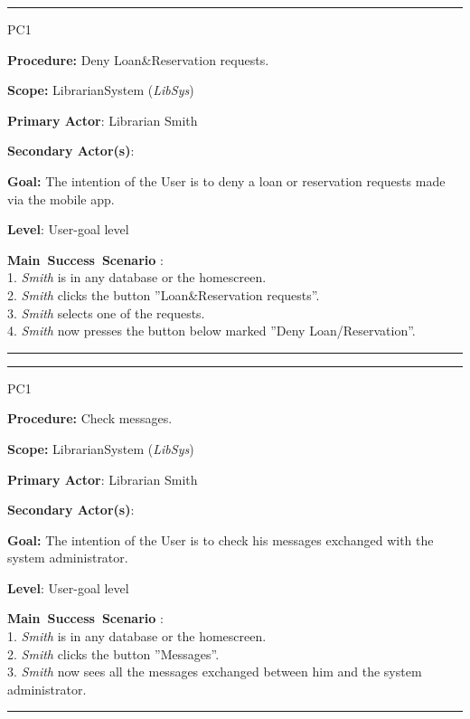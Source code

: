 
\vspace{0.5cm}
\hrule
\begin{lyxlist}{PC1}
\small{
\item [\textbf{Procedure:}] Deny Loan\&Reservation requests.
\item [\textbf{Scope:}] LibrarianSystem (\emph{LibSys})
\item [\textbf{Primary Actor}:] Librarian Smith
\item [\textbf{Secondary Actor(s)}:] 
\item [\textbf{Goal:}] The intention of the User is to deny a loan or
reservation requests made via the mobile app.
\item [\textbf{Level}:] User-goal level
\item [\textbf{Main~Success~Scenario}]:\\
1. \emph{Smith} is in any database or the homescreen.\\
2. \emph{Smith} clicks the button ''Loan\&Reservation requests''.\\
3. \emph{Smith} selects one of the requests.\\
4. \emph{Smith} now presses the button below marked ''Deny
Loan/Reservation''.\\

}

\end{lyxlist}
\hrule


\vspace{0.5cm}
\hrule
\begin{lyxlist}{PC1}
\small{
\item [\textbf{Procedure:}] Check messages.
\item [\textbf{Scope:}] LibrarianSystem (\emph{LibSys})
\item [\textbf{Primary Actor}:] Librarian Smith
\item [\textbf{Secondary Actor(s)}:] 
\item [\textbf{Goal:}] The intention of the User is to check his messages
exchanged with the system administrator.
\item [\textbf{Level}:] User-goal level
\item [\textbf{Main~Success~Scenario}]:\\
1. \emph{Smith} is in any database or the homescreen.\\
2. \emph{Smith} clicks the button ''Messages''.\\
3. \emph{Smith} now sees all the messages exchanged between him and the
system administrator.\\

}

\end{lyxlist}
\hrule

